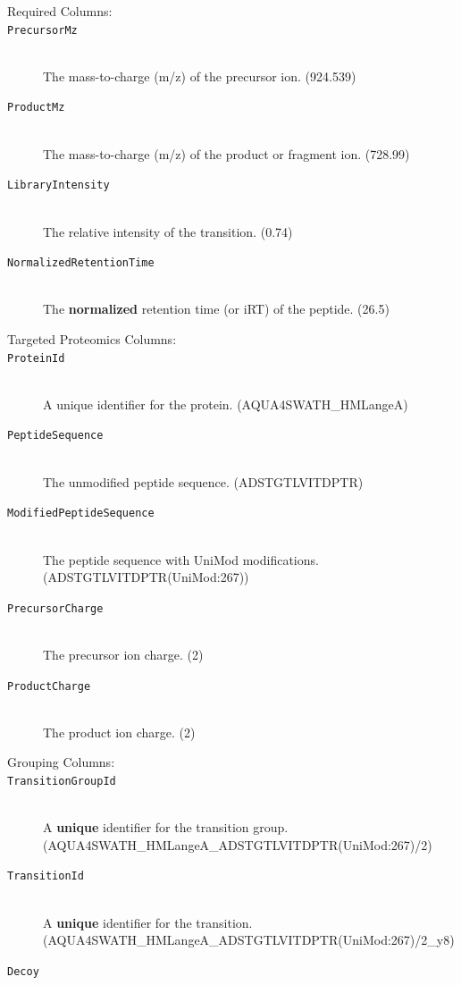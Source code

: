 \begin{description}
  \item[Required Columns:]
  \item[\texttt{PrecursorMz}] \hfill \\
  The mass-to-charge (m/z) of the precursor ion. (924.539)
  \item[\texttt{ProductMz}] \hfill \\
  The mass-to-charge (m/z) of the product or fragment ion. (728.99)
   \item[\texttt{LibraryIntensity}] \hfill \\
  The relative intensity of the transition. (0.74)
  \item[\texttt{NormalizedRetentionTime}] \hfill \\
  The \textbf{normalized} retention time (or iRT) \cite{Escher2012Using} of the peptide. (26.5)
  \newline
  \item[Targeted Proteomics Columns:]
  \item[\texttt{ProteinId}] \hfill \\
  A unique identifier for the protein. (AQUA4SWATH\_HMLangeA)
  \item[\texttt{PeptideSequence}] \hfill \\
  The unmodified peptide sequence. (ADSTGTLVITDPTR)
  \item[\texttt{ModifiedPeptideSequence}] \hfill \\
  The peptide sequence with UniMod modifications. (ADSTGTLVITDPTR(UniMod:267))
  \item[\texttt{PrecursorCharge}] \hfill \\
  The precursor ion charge. (2)
  \item[\texttt{ProductCharge}] \hfill \\
  The product ion charge. (2)
  \newline
  \item[Grouping Columns:]
  \item[\texttt{TransitionGroupId}] \hfill \\
  A \textbf{unique} identifier for the transition group.\\
  (AQUA4SWATH\_HMLangeA\_ADSTGTLVITDPTR(UniMod:267)/2)
  \item[\texttt{TransitionId}] \hfill \\
  A \textbf{unique} identifier for the transition.\\
  (AQUA4SWATH\_HMLangeA\_ADSTGTLVITDPTR(UniMod:267)/2\_y8)
  \item[\texttt{Decoy}] \hfill \\

\end{description}
